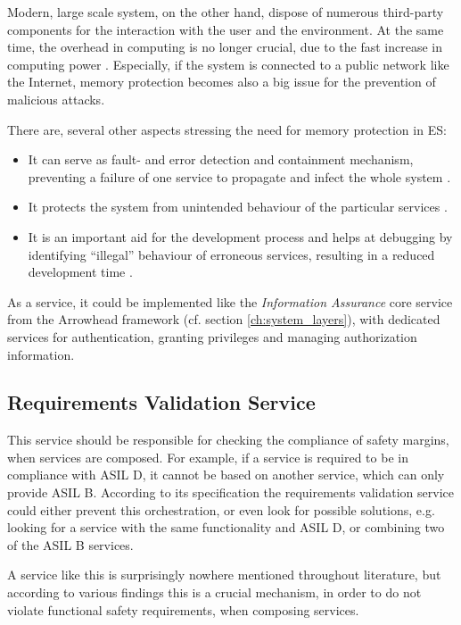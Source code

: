 Modern, large scale system, on the other hand, dispose of numerous third-party components for the interaction with the user and the environment. At the same time, the overhead in computing is no longer crucial, due to the fast increase in computing power  \cite{yamada2008}. Especially, if the system is connected to a public network like the Internet, memory protection becomes also a big issue for the prevention of malicious attacks.

There are, several other aspects stressing the need for memory protection in ES:

\begin{itemize}
\item It can serve as fault- and error detection and containment mechanism, preventing a failure of one service to propagate and infect the whole system \cite{yamada2008}.
\item It protects the system from unintended behaviour of the particular services \cite{yamada2014}.
\item It is an important aid for the development process and helps at debugging by identifying ``illegal'' behaviour of erroneous services, resulting in a reduced development time \cite{yamada2008} \cite{yamada2014}.
\end{itemize}

As a service, it could be implemented like the \emph{Information Assurance} core service from the Arrowhead framework (cf. section \ref{ch:system_layers}), with dedicated services for authentication, granting privileges and managing authorization information.


\subsection{Requirements Validation Service}

This service should be responsible for checking the compliance of safety margins, when services are composed. For example, if a service is required to be in compliance with ASIL D, it cannot be based on another service, which can only provide ASIL B. According to its specification the requirements validation service could either prevent this orchestration, or even look for possible solutions, e.g. looking for a service with the same functionality and ASIL D, or combining two of the ASIL B services.

A service like this is surprisingly nowhere mentioned throughout literature, but according to various findings this is a crucial mechanism, in order to do not violate functional safety requirements, when composing services.








